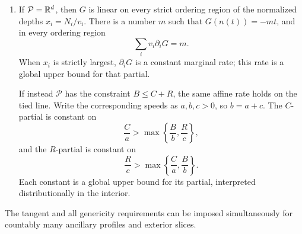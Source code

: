 \begin{lemma}
\begin{enumerate}[label=\textup{(\roman*)}]
\item
If $\mathcal P=\mathbb R^d$, then $G$ is linear on every strict ordering
region of the normalized depths $x_i=N_i/v_i$.  There is a number
$m$ such that $G(n(t))=-mt$, and in every ordering region
\[
\sum_i v_i\partial_iG=m.
\]
When $x_i$ is strictly largest, $\partial_iG$ is a constant
marginal rate; this rate is a global upper bound for that partial.

If instead $\mathcal P$ has the constraint $B\leq C+R$, the same
affine rate holds on the tied line.  Write the corresponding
speeds as $a,b,c>0$, so $b=a+c$.  The $C$-partial is constant on
\[
\frac Ca>\max\left\{\frac Bb,\frac Rc\right\},
\]
and the $R$-partial is constant on
\[
\frac Rc>\max\left\{\frac Ca,\frac Bb\right\}.
\]
Each constant is a global upper bound for its partial,
interpreted distributionally in the interior.
\end{enumerate}
The tangent and all genericity requirements can be imposed
simultaneously for countably many ancillary profiles and exterior
slices.
\end{lemma}

